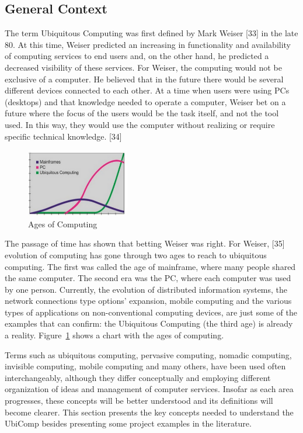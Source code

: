 \documentclass{acm_proc_article-sp}
\begin{document}
\subsection{General Context}
The term Ubiquitous Computing was first defined by Mark Weiser [33] in the late 80. At this time, Weiser predicted an increasing in functionality and availability of computing services to end users and, on the other hand, he predicted a decreased visibility of these services. For Weiser, the computing would not be exclusive of a computer. He believed that in the future there would be several different devices connected to each other. At a time when users were using PCs (desktops) and that knowledge needed to operate a computer,  Weiser bet on a future where the focus of the users would be the task itself, and not the tool used. In this way, they would use the computer without realizing or require specific technical knowledge. [34]
\begin{figure}[h]
    \includegraphics[width=0.4\textwidth,natwidth=610,natheight=642]{pictures/era.png}
    \caption{Ages of Computing}
    \label{fig:era}
\end{figure}
\newline
\newline
The passage of time has shown that betting Weiser was right. For Weiser, [35] evolution of computing has gone through two ages to reach to ubiquitous computing. The first was called the age of mainframe, where many people shared the same computer. The second era was the PC, where each computer was used by one person. Currently, the evolution of distributed information systems, the network connections type options'  expansion, mobile computing and the various types of applications on non-conventional computing devices, are just some of the examples that can confirm: the Ubiquitous Computing (the third age) is already a reality. Figure~\ref{fig:era} shows a chart with the ages of computing.
\newline
\newline

Terms such as ubiquitous computing, pervasive computing, nomadic computing, invisible computing, mobile computing and many others, have been used often interchangeably, although they differ conceptually and employing different organization of ideas and management of computer services. Insofar as each area progresses, these concepts will be better understood and its definitions will become clearer. This section presents the key concepts needed to understand the UbiComp besides presenting some project examples in the literature.
\end{document}
